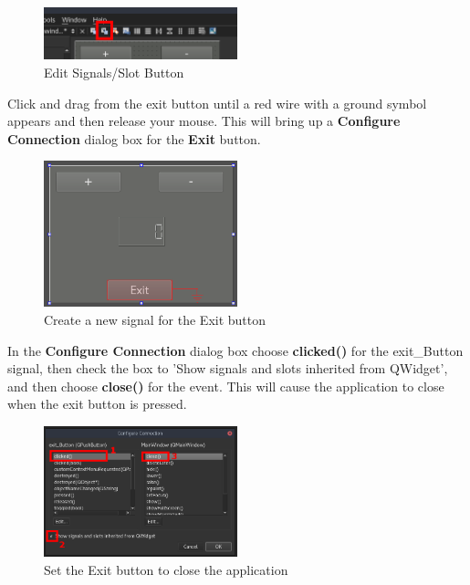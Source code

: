 \documentclass{article}
\begin{document}
	\begin{figure}[H]
		\centering
		\includegraphics[width=0.5\textwidth]{pics/Signals_Button.png}
		\caption{Edit Signals/Slot Button}
		\label{Signals_Button}
	\end{figure}

Click and drag from the exit button until a red wire with a ground symbol appears and then release your mouse. This will bring up a \textbf{Configure Connection} dialog box for the \textbf{Exit} button.

	\begin{figure}[H]
		\centering
		\includegraphics[width=0.5\textwidth]{pics/Exit_Signal.png}
		\caption{Create a new signal for the Exit button}
		\label{Exit_Signal}
	\end{figure}

In the \textbf{Configure Connection} dialog box choose \textbf{clicked()} for the exit\_Button signal, then check the box to 'Show signals and slots inherited from QWidget', and then choose \textbf{close()} for the event. This will cause the application to close when the exit button is pressed.

	\begin{figure}[H]
		\centering
		\includegraphics[width=0.5\textwidth]{pics/Configure_Exit.png}
		\caption{Set the Exit button to close the application}
		\label{Configure_Exit}
	\end{figure}
\end{document}
